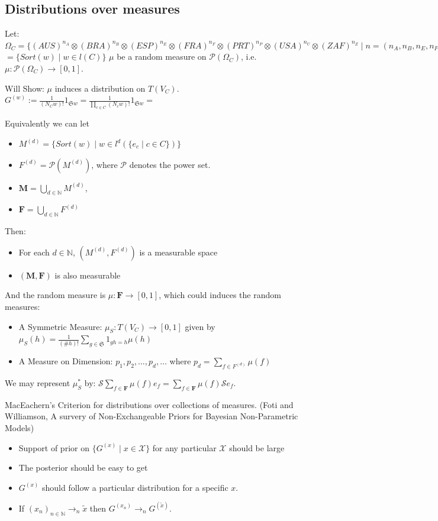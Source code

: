 \documentclass{article}
\begin{document}
\subsection{Distributions over measures}
Let:
$\Omega_C = \{(AUS)^{n_A}\otimes(BRA)^{n_B}\otimes(ESP)^{n_E}\otimes(FRA)^{n_F}\otimes(PRT)^{n_P}\otimes(USA)^{n_U}\otimes(ZAF)^{n_Z} \mid n = (n_A,n_B,n_E,n_F,n_P,n_U,n_Z) \in \mathbb{N}^7 \}$ $ = \{Sort(w) \mid w \in l(C)\}$
$\mu$ be a random measure on $\mathscr{P}(\Omega_C)$, i.e. $\mu:\mathscr{P}(\Omega_C)\rightarrow[0,1]$. 

Will Show: $\mu$ induces a distribution on $T(V_C)$.
$G^{(w)} := \frac{1}{ (N_C w)!}1_{\mathfrak{S}w} = \frac{1}{ \prod_{c\in C}(N_{c}w)!}1_{\mathfrak{S}w} =$

Equivalently we can let 
\begin{itemize}
\item $M^{(d)} = \{Sort(w) \mid w \in l^d(\{e_c\mid c\in C\}) \} $
\item $F^{(d)} = \mathscr{P}(M^{(d)})$, where $\mathscr{P}$ denotes the power set.
\item $\mathbf{M} = \bigcup_{d\in\mathbb{N}}M^{(d)}$,
\item $\mathbf{F} = \bigcup_{d\in\mathbb{N}} F^{(d)}$
\end{itemize}
Then:
\begin{itemize}
\item For each $d\in\mathbb{N}$, $(M^{(d)},F^{(d)})$ is a measurable space
\item $(\mathbf{M},\mathbf{F})$ is also measurable
\end{itemize}

And the random measure is $\mu: \mathbf{F}\rightarrow [0,1]$, which could induces the random measures: 
\begin{itemize}
\item A Symmetric Measure: $\mu_S: T(V_C)\rightarrow[0,1]$ given by $ \mu_S(h) = \frac{1}{(\#h)!}\sum_{g\in\mathfrak{S}} 1_{gh=h}\mu(h)$
\item A Measure on Dimension: $p_1,p_2,\dots,p_d,\dots$ where $p_d = \sum_{f\in F^{(d)}}\mu(f)$
\end{itemize}

We may represent $\mu^*_S$ by: $\mathcal{S}\sum_{f\in\mathbf{F}}\mu(f)e_f =\sum_{f\in\mathbf{F}}\mu(f) \mathcal{S}e_f $.

MacEachern's Criterion for distributions over collections of measures. (Foti and Williamson, A survery of Non-Exchangeable Priors for Bayesian Non-Parametric Models)
\begin{itemize}
\item Support of prior on $\{G^{(x)} \mid x \in \mathcal{X}\}$ for any particular $\mathcal{X}$ should be large
\item The posterior should be easy to get
\item $G^{(x)}$ should follow a particular distribution for a specific $x$.
\item If $(x_n)_{n\in \mathbb{N}}\rightarrow_n \tilde{x}$ then $G^{(x_n)}\rightarrow_n G^{(\tilde{x})}$.
\end{itemize}
\end{document}
